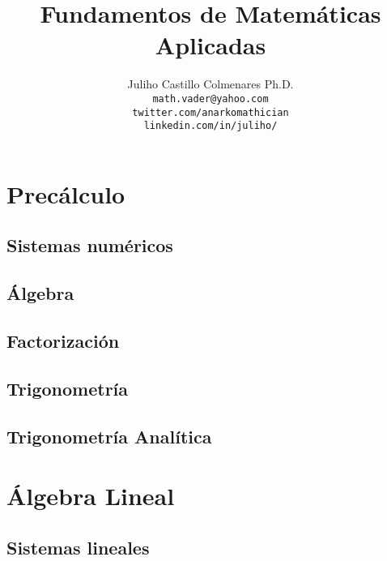 \documentclass[
12pt,
]{tufte-book}
\title{Fundamentos de Matemáticas Aplicadas}
\author[Juliho Castillo]{Juliho Castillo Colmenares Ph.D.\\
\texttt{math.vader@yahoo.com}\\
\texttt{twitter.com/anarkomathician}\\
\texttt{linkedin.com/in/juliho/}}
\begin{document}
	\maketitle
	\tableofcontents


\part{Precálculo}

\chapter{Sistemas numéricos}










\chapter{Álgebra}








\chapter{Factorización}







\chapter{Trigonometría}


\chapter{Trigonometría Analítica}



\part{Álgebra Lineal}

\chapter{Sistemas lineales}





\end{document}
